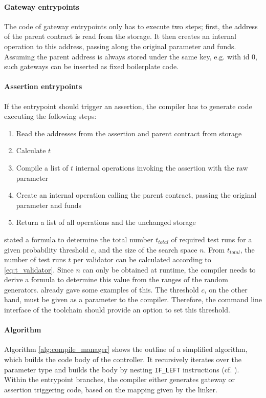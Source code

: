 \paragraph{Gateway entrypoints}
The code of gateway entrypoints only has to execute two steps; first, the address of the parent contract is read from the storage. It then creates an internal operation to this address, passing along the original parameter and funds. Assuming the parent address is always stored under the same key, e.g. with id 0, such gateways can be inserted as fixed boilerplate code.

\paragraph{Assertion entrypoints}
If the entrypoint should trigger an assertion, the compiler has to generate code executing the following steps:
\begin{enumerate}
\itemsep-0.5em
\item Read the addresses from the assertion and parent contract from storage
\item Calculate $t$
\item Compile a list of $t$ internal operations invoking the assertion with the raw parameter
\item Create an internal operation calling the parent contract, passing the original parameter and funds
\item Return a list of all operations and the unchanged storage
\end{enumerate}
 stated a formula to determine the total number $t_{total}$ of required test runs for a given probability threshold $c$, and the size of the search space $n$. From $t_{total}$, the number of test runs $t$ per validator can be calculated according to \eqref{eq:t_validator}. Since $n$ can only be obtained at runtime, the compiler needs to derive a formula to determine this value from the ranges of the random generators.  already gave some examples of this. 
The threshold $c$, on the other hand, must be given as a parameter to the compiler. Therefore, the command line interface of the toolchain should provide an option to set this threshold.

\paragraph{Algorithm}
Algorithm \ref{alg:compile_manager} shows the outline of a simplified algorithm, which builds the code body of the controller. It recursively iterates over the parameter type and builds the body by nesting \texttt{IF\_LEFT} instructions (cf. ). Within the entrypoint branches, the compiler either generates gateway or assertion triggering code, based on the mapping given by the linker.

